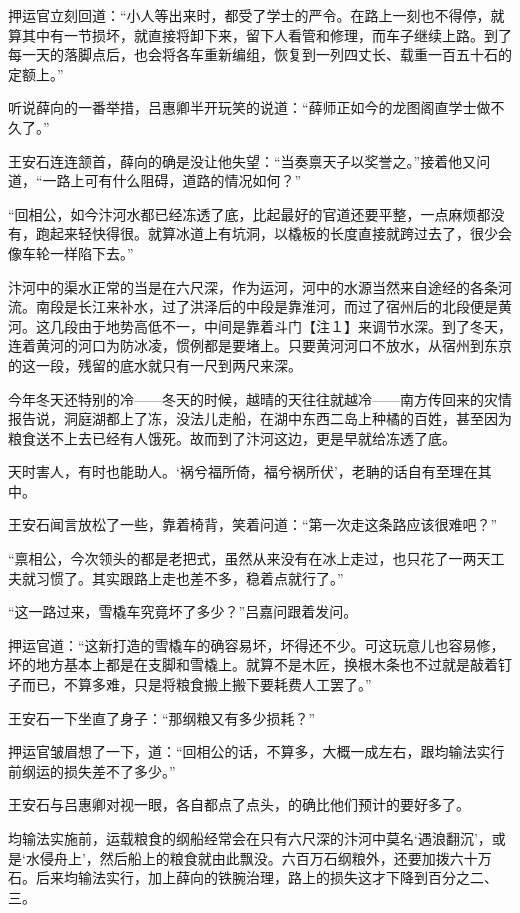 押运官立刻回道：“小人等出来时，都受了学士的严令。在路上一刻也不得停，就算其中有一节损坏，就直接将卸下来，留下人看管和修理，而车子继续上路。到了每一天的落脚点后，也会将各车重新编组，恢复到一列四丈长、载重一百五十石的定额上。”

听说薛向的一番举措，吕惠卿半开玩笑的说道：“薛师正如今的龙图阁直学士做不久了。”

王安石连连颔首，薛向的确是没让他失望：“当奏禀天子以奖誉之。”接着他又问道，“一路上可有什么阻碍，道路的情况如何？”

“回相公，如今汴河水都已经冻透了底，比起最好的官道还要平整，一点麻烦都没有，跑起来轻快得很。就算冰道上有坑洞，以橇板的长度直接就跨过去了，很少会像车轮一样陷下去。”

汴河中的渠水正常的当是在六尺深，作为运河，河中的水源当然来自途经的各条河流。南段是长江来补水，过了洪泽后的中段是靠淮河，而过了宿州后的北段便是黄河。这几段由于地势高低不一，中间是靠着斗门【注１】来调节水深。到了冬天，连着黄河的河口为防冰凌，惯例都是要堵上。只要黄河河口不放水，从宿州到东京的这一段，残留的底水就只有一尺到两尺来深。

今年冬天还特别的冷——冬天的时候，越晴的天往往就越冷——南方传回来的灾情报告说，洞庭湖都上了冻，没法儿走船，在湖中东西二岛上种橘的百姓，甚至因为粮食送不上去已经有人饿死。故而到了汴河这边，更是早就给冻透了底。

天时害人，有时也能助人。‘祸兮福所倚，福兮祸所伏’，老聃的话自有至理在其中。

王安石闻言放松了一些，靠着椅背，笑着问道：“第一次走这条路应该很难吧？”

“禀相公，今次领头的都是老把式，虽然从来没有在冰上走过，也只花了一两天工夫就习惯了。其实跟路上走也差不多，稳着点就行了。”

“这一路过来，雪橇车究竟坏了多少？”吕嘉问跟着发问。

押运官道：“这新打造的雪橇车的确容易坏，坏得还不少。可这玩意儿也容易修，坏的地方基本上都是在支脚和雪橇上。就算不是木匠，换根木条也不过就是敲着钉子而已，不算多难，只是将粮食搬上搬下要耗费人工罢了。”

王安石一下坐直了身子：“那纲粮又有多少损耗？”

押运官皱眉想了一下，道：“回相公的话，不算多，大概一成左右，跟均输法实行前纲运的损失差不了多少。”

王安石与吕惠卿对视一眼，各自都点了点头，的确比他们预计的要好多了。

均输法实施前，运载粮食的纲船经常会在只有六尺深的汴河中莫名‘遇浪翻沉’，或是‘水侵舟上’，然后船上的粮食就由此飘没。六百万石纲粮外，还要加拨六十万石。后来均输法实行，加上薛向的铁腕治理，路上的损失这才下降到百分之二、三。

